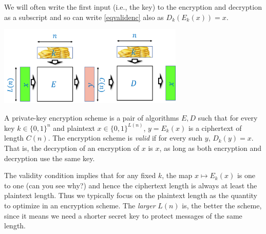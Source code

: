 We will often write the first input (i.e., the key) to the encryption
and decryption as a subscript and so can write \eqref{eqvalidenc} also
as \(D_k(E_k(x))=x\).


\begin{marginfigure}
\centering
\includegraphics[width=\linewidth, height=1.5in, keepaspectratio]{../figure/encryptionvalid.png}
\caption{A private-key encryption scheme is a pair of algorithms \(E,D\)
such that for every key \(k\in \{0,1\}^n\) and plaintext
\(x\in \{0,1\}^{L(n)}\), \(y=E_k(x)\) is a ciphertext of length
\(C(n)\). The encryption scheme is \emph{valid} if for every such \(y\),
\(D_k(y)=x\). That is, the decryption of an encryption of \(x\) is
\(x\), as long as both encryption and decryption use the same key.}
\label{validencryption}
\end{marginfigure}

The validity condition implies that for any fixed \(k\), the map
\(x \mapsto E_k(x)\) is one to one (can you see why?) and hence the
ciphertext length is always at least the plaintext length. Thus we
typically focus on the plaintext length as the quantity to optimize in
an encryption scheme. The \emph{larger} \(L(n)\) is, the better the
scheme, since it means we need a shorter secret key to protect messages
of the same length.

